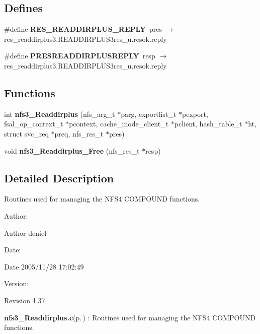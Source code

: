 \subsection*{Defines}
\begin{CompactItemize}
\item 
\#define {\bf RES\_\-READDIRPLUS\_\-REPLY}\ pres $\rightarrow$ res\_\-readdirplus3.READDIRPLUS3res\_\-u.resok.reply
\item 
\#define {\bf PRESREADDIRPLUSREPLY}\ resp $\rightarrow$ res\_\-readdirplus3.READDIRPLUS3res\_\-u.resok.reply
\end{CompactItemize}
\subsection*{Functions}
\begin{CompactItemize}
\item 
int {\bf nfs3\_\-Readdirplus} (nfs\_\-arg\_\-t $\ast$parg, exportlist\_\-t $\ast$pexport, fsal\_\-op\_\-context\_\-t $\ast$pcontext, cache\_\-inode\_\-client\_\-t $\ast$pclient, hash\_\-table\_\-t $\ast$ht, struct svc\_\-req $\ast$preq, nfs\_\-res\_\-t $\ast$pres)
\item 
void {\bf nfs3\_\-Readdirplus\_\-Free} (nfs\_\-res\_\-t $\ast$resp)
\end{CompactItemize}


\subsection{Detailed Description}
Routines used for managing the NFS4 COMPOUND functions. 

\begin{Desc}
\item[Author:]\begin{Desc}
\item[Author]deniel \end{Desc}
\end{Desc}
\begin{Desc}
\item[Date:]\begin{Desc}
\item[Date]2005/11/28 17:02:49 \end{Desc}
\end{Desc}
\begin{Desc}
\item[Version:]\begin{Desc}
\item[Revision]1.37 \end{Desc}
\end{Desc}
{\bf nfs3\_\-Readdirplus.c}{\rm (p.\,\pageref{nfs3__Readdirplus_8c})} : Routines used for managing the NFS4 COMPOUND functions.

